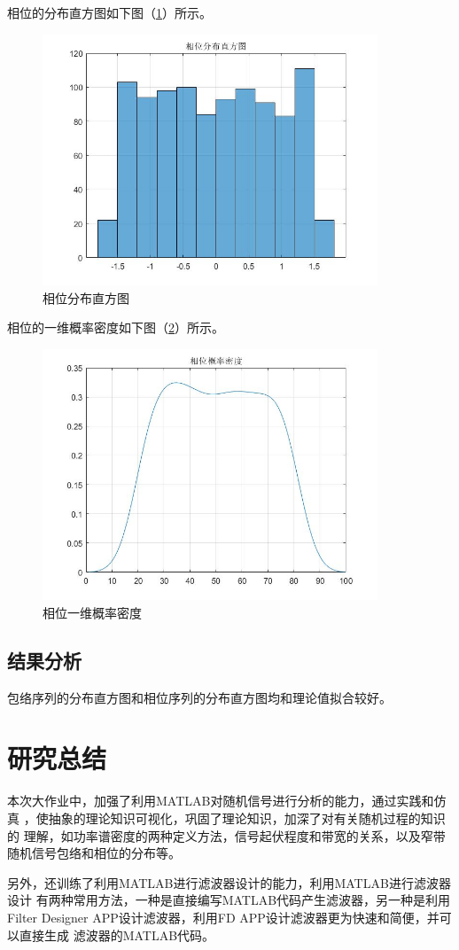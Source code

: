 \documentclass[UTF-8, a4paper, 12pt]{ctexart}
\begin{document}
相位的分布直方图如下图（\ref{f85}）所示。
\begin{figure}[htbp]
    \centering
    \includegraphics[width=10cm]{figs/f85.jpg}
    \caption{相位分布直方图}
    \label{f85}
\end{figure}
\newpage
相位的一维概率密度如下图（\ref{f84}）所示。
\begin{figure}[htbp]
    \centering
    \includegraphics[width=10cm]{figs/f84.jpg}
    \caption{相位一维概率密度}
    \label{f84}
\end{figure}
\subsection{结果分析}

包络序列的分布直方图和相位序列的分布直方图均和理论值拟合较好。
\section{研究总结}

本次大作业中，加强了利用MATLAB对随机信号进行分析的能力，通过实践和仿真
，使抽象的理论知识可视化，巩固了理论知识，加深了对有关随机过程的知识的
理解，如功率谱密度的两种定义方法，信号起伏程度和带宽的关系，以及窄带
随机信号包络和相位的分布等。

另外，还训练了利用MATLAB进行滤波器设计的能力，利用MATLAB进行滤波器设计
有两种常用方法，一种是直接编写MATLAB代码产生滤波器，另一种是利用Filter
Designer APP设计滤波器，利用FD APP设计滤波器更为快速和简便，并可以直接生成
滤波器的MATLAB代码。
\end{document}
